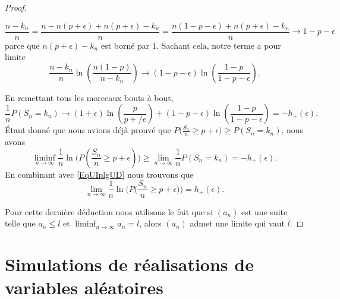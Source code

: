 \begin{proof}
\begin{enumerate}
            \begin{equation}
                \frac{ n-k_n }{ n }=\frac{ n-n(p+\epsilon)+n(p+\epsilon)-k_n }{ n }=\frac{ n(1-p-\epsilon)+n(p+\epsilon)-k_n }{ n }\to 1-p-\epsilon
            \end{equation}
            parce que \( n(p+\epsilon)-k_n\) est borné par \( 1\). Sachant cela, notre terme a pour limite
            \begin{equation}
                \frac{ n-k_n }{ n }\ln\left( \frac{ n(1-p) }{ n-k_n } \right)\to (1-p-\epsilon)\ln\left( \frac{ 1-p }{ 1-p-\epsilon } \right).
            \end{equation}
            
    \end{enumerate}
    En remettant tous les morceaux bouts à bout,
    \begin{equation}
        \frac{1}{ n }P(S_n=k_n)\to (1+\epsilon)\ln\left( \frac{ p }{ p+/e } \right)+(1-p-\epsilon)\ln\left( \frac{ 1-p }{ 1-p-\epsilon } \right)=-h_+(\epsilon).
    \end{equation}
    Étant donné que nous avions déjà prouvé que \( P\big( \frac{ S_n }{ n }\geq p+\epsilon \big)\geq P(S_n=k_n)\), nous avons
    \begin{equation}
        \liminf_{n\to \infty}\frac{1}{ n }\ln\Big( P(\frac{ S_n }{ n }\geq p+\epsilon) \Big)\geq \lim_{n\to \infty} \frac{1}{ n }P(S_n=k_n)=-h_+(\epsilon).
    \end{equation}
    En combinant avec \eqref{EqUIplgUD} nous trouvons que
    \begin{equation}
        \lim_{n\to \infty} \frac{1}{ n }\ln\Big( P\big( \frac{ S_n }{ n }\geq p+\epsilon \big) \Big)=h_+(\epsilon).
    \end{equation}
    
    Pour cette dernière déduction nous utilisons le fait que si \( (a_n)\) est une suite telle que \( a_n\leq l\) et \( \liminf_{n\to\infty}a_n=l\), alors \( (a_n)\) admet une limite qui vaut \( l\).
\end{proof}




\section{Simulations de réalisations de variables aléatoires}

